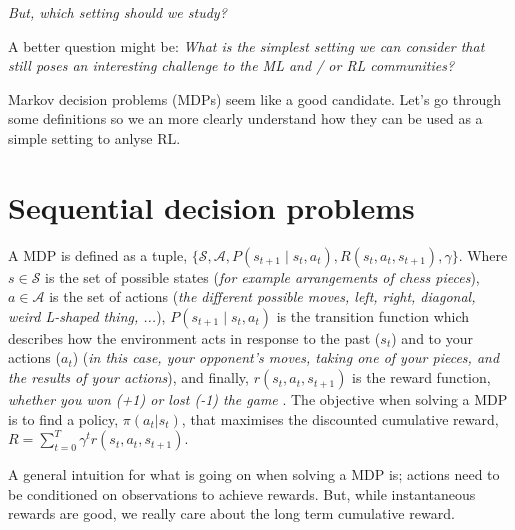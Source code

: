\begin{displayquote}
  \textit{But, which setting should we study?}
\end{displayquote}


\begin{displayquote}
  A better question might be: \textit{What is the simplest setting we can
  consider that still poses an interesting challenge to the ML and / or RL communities?}
\end{displayquote}

Markov decision problems (MDPs) seem like a good candidate. Let's go through some definitions so we an more clearly understand how they can be used as a
simple setting to anlyse RL.

\section{Sequential decision problems}


A MDP is defined as a tuple, \(\{\mathcal S, \mathcal A, P(s_{t+1} \mid s_t, a_t),R(s_t, a_t, s_{t+1}), \gamma\}\). Where \(s \in \mathcal S\) is the set of possible states (\textit{for example arrangements of chess pieces}), \(a \in \mathcal A\) is the set of actions (\textit{the different possible moves, left, right, diagonal, weird L-shaped thing, ...}),  \(P(s_{t+1} \mid s_t, a_t)\) is the transition function which describes how the environment acts in response to the past (\(s_t\)) and to your actions (\(a_t\)) (\textit{in this case, your opponent's moves, taking one of your pieces, and the results of your actions}), and finally, \(r(s_t, a_t, s_{t+1})\) is the reward function, \textit{whether you won (+1) or lost (-1) the game }.
The objective when solving a MDP is to find a policy, $\pi(a_t | s_t)$, that maximises the discounted cumulative reward, \(R =\sum_{t=0}^T \gamma^t r(s_t, a_t, s_{t+1}) \).


A general intuition for what is going on when solving a MDP is; actions need to
be conditioned on observations to achieve rewards. But, while instantaneous
rewards are good, we really care about the long term cumulative reward.

